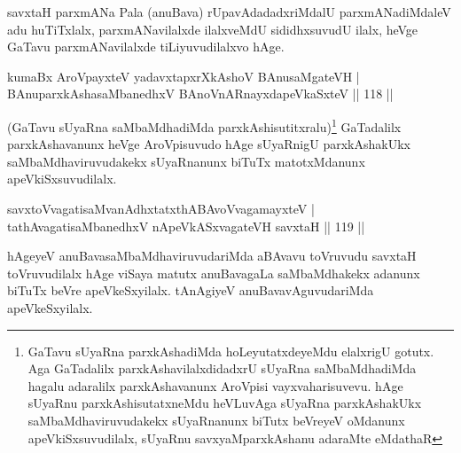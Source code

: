 \begin{artha}%
savxtaH parxmANa Pala (anuBava) rUpavAdadadxriMdalU parxmANadiMdaleV adu huTiTxlalx, parxmANavilalxde ilalxveMdU sididhxsuvudU ilalx, heVge GaTavu parxmANavilalxde tiLiyuvudilalxvo hAge.
\end{artha}


\begin{shl}
kumaBx AroVpayxteV yadavxtapxrXkAshoV BAnusaMgateVH |\\
BAnuparxkAshasaMbanedhxV BAnoVnARnayxdapeVkaSxteV \hfill || 118 ||
\end{shl}

\begin{artha}
(GaTavu sUyaRna saMbaMdhadiMda parxkAshisutitxralu)\footnote[1]{GaTavu sUyaRna parxkAshadiMda hoLeyutatxdeyeMdu elalxrigU gotutx. Aga GaTadalilx parxkAshavilalxdidadxrU sUyaRna saMbaMdhadiMda hagalu adaralilx parxkAshavanunx AroVpisi vayxvaharisuvevu. hAge sUyaRnu parxkAshisutatxneMdu heVLuvAga sUyaRna parxkAshakUkx saMbaMdhaviruvudakekx sUyaRnanunx biTutx beVreyeV oMdanunx apeVkiSxsuvudilalx, sUyaRnu savxyaMparxkAshanu adaraMte eMdathaR} GaTadalilx parxkAshavanunx heVge AroVpisuvudo hAge sUyaRnigU parxkAshakUkx saMbaMdhaviruvudakekx sUyaRnanunx biTuTx matotxMdanunx apeVkiSxsuvudilalx.
\end{artha}

\begin{shl}
\footnotemark[2]savxtoV\s vagatisaMvanAdhxtatxthA\s BAvoV\s vagamayxteV |\\
tathA\s vagatisaMbanedhxV nApeVkASx\s vagateVH savxtaH \hfill || 119 ||
\end{shl}

\begin{artha}
hAgeyeV anuBavasaMbaMdhaviruvudariMda aBAvavu toVruvudu savxtaH toVruvudilalx hAge viSaya matutx anuBavagaLa saMbaMdhakekx adanunx biTuTx beVre apeVkeSxyilalx. tAnAgiyeV anuBavavAguvudariMda apeVkeSxyilalx.
\end{artha}

